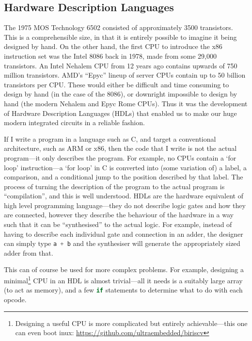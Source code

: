 \documentclass[12pt]{article}
\begin{document}
\subsection{Hardware Description Languages}

The 1975 MOS Technology 6502 consisted of approximately 3500 transistors. This is a comprehensible size, in that it is entirely possible to imagine it being designed by hand. On the other hand, the first CPU to introduce the x86 instruction set was the Intel 8086 back in 1978, made from some 29,000 transistors. An Intel Nehalem CPU from 12 years ago contains upwards of 750 million transistors. AMD's ``Epyc'' lineup of server CPUs contain up to 50 billion transistors per CPU. These would either be difficult and time consuming to design by hand (in the case of the 8086), or downright impossible to design by hand (the modern Nehalem and Epyc Rome CPUs). Thus it was the development of Hardware Description Languages (HDLs) that enabled us to make our huge modern integrated circuits in a reliable fashion.

If I write a program in a language such as C, and target a conventional architecture, such as ARM or x86, then the code that I write is not the actual program---it only describes the program. For example, no CPUs contain a `for loop' instruction---a `for loop' in C is converted into (some variation of) a label, a comparison, and a conditional jump to the position described by that label. The process of turning the description of the program to the actual program is ``compilation'', and this is well understood.
HDLs are the hardware equivalent of high level programming language---they do not describe logic gates and how they are connected, however they describe the behaviour of the hardware in a way such that it can be ``synthesised'' to the actual logic. For example, instead of having to describe each individual gate and connection in an adder, the designer can simply type \lstinline[language=Verilog]|a + b| and the synthesiser will generate the appropriately sized adder from that.

This can of course be used for more complex problems. For example, designing a minimal\footnote{Designing a useful CPU is more complicated but entirely achievable---this one can even boot inux: \url{https://github.com/ultraembedded/biriscv}} CPU in an HDL is almost trivial---all it needs is a suitably large array (to act as memory), and a few \lstinline[language=Verilog]|if| statements to determine what to do with each opcode.
\end{document}
